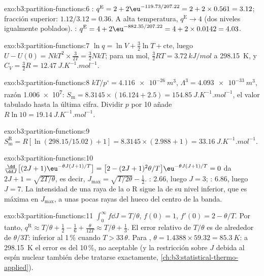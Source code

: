 \begin{solution}{exo:b3:partition-functions:6}
: $q^{\mathrm E} = 2 + 2\eu^{-119.73/207.22} = 2 + 2 \times 0.561 = 3.12$; fracción superior: $1.12/3.12
= 0.36$. A alta temperatura, $q^{\mathrm E} \to 4$ (dos niveles igualmente poblados). :
$q^{\mathrm E} = 4 + 2\eu^{-882.35/207.22} = 4 + 2 \times 0.0142 = 4.03$.
\end{solution}

\begin{solution}{exo:b3:partition-functions:7}
$\ln q = \ln V + \frac32\ln T + \text{cte}$, luego $U - U(0) = NkT^2 \times \frac{3}{2T} = \frac32NkT$; para un
mol, $\frac32RT = \qty{3.72}{kJ/mol}$ a \qty{298.15}{K}, y $C_V = \frac32R = \qty{12.47}{J.K^{-1}.mol^{-1}}$.
\end{solution}

\begin{solution}{exo:b3:partition-functions:8}
$kT/p^\circ = \qty{4.116e-26}{m^3}$, $\Lambda^3 = \qty{4.093e-33}{m^3}$, razón \num{1.006e7}:
$S_{\mathrm m} = 8.3145 \times (16.124 + 2.5) = \qty{154.85}{J.K^{-1}.mol^{-1}}$, el valor tabulado hasta la
última cifra. Dividir $p$ por 10 añade $R\ln10 = \qty{19.14}{J.K^{-1}.mol^{-1}}$.
\end{solution}

\begin{solution}{exo:b3:partition-functions:9}
$S^{\mathrm R}_{\mathrm m} = R[\ln(298.15/15.02) + 1] = 8.3145 \times (2.988 + 1) = \qty{33.16}{J.K^{-1}.mol^{-1}}$.
\end{solution}

\begin{solution}{exo:b3:partition-functions:10}
$\frac{\dd}{\dd J}\bigl[(2J+1)\eu^{-\theta J(J+1)/T}\bigr] = \bigl[2 - (2J+1)^2\theta/T\bigr]\eu^{-\theta J(J+1)/T} = 0$ da
$2J + 1 = \sqrt{2T/\theta}$, es decir, $J_{\max} = \sqrt{T/2\theta} - \frac12$. : 2.66, luego $J = 3$; :
6.86, luego $J = 7$. La intensidad de una raya de la  o R sigue la
 de su nivel inferior, que es máxima en $J_{\max}$, a unas pocas rayas del hueco
del centro de la banda.
\end{solution}

\begin{solution}{exo:b3:partition-functions:11}
$\int_0^\infty f\dd J = T/\theta$, $f(0) = 1$, $f'(0) = 2 - \theta/T$. Por tanto, $q^{\mathrm R} \approx T/\theta + \frac12 -
\frac16 + \frac{\theta}{12T} \approx T/\theta + \frac13$. El error relativo de $T/\theta$ es de alrededor de $\theta/3T$:
inferior al 1\,\% cuando $T > 33\,\theta$. Para , $\theta = 1.4388 \times 59.32 = \qty{85.3}{K}$: a
\qty{298.15}{K} el error es del 10\,\%, no aceptable (y la restricción sobre $J$ debida al espín nuclear
también debe tratarse exactamente, \cref{ch:b3:statistical-thermo-applied}).
\end{solution}

